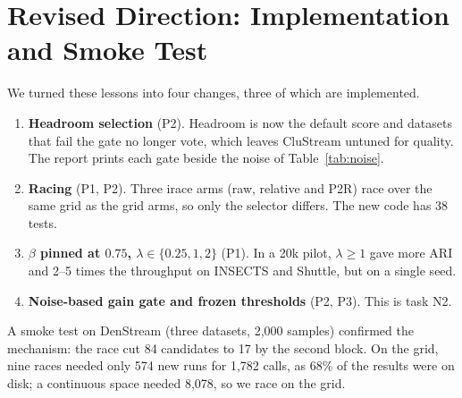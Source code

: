 \section{Revised Direction: Implementation and Smoke Test}
\label{sec:apply}

We turned these lessons into four changes, three of which are implemented.
\begin{enumerate}[label=\textbf{(\alph*)},leftmargin=2em,itemsep=1pt,topsep=2pt]
  \item \textbf{Headroom selection} (P2). Headroom is now the default score and datasets that fail the gate no longer vote, which leaves CluStream untuned for quality. The report prints each gate beside the noise of Table~\ref{tab:noise}.
  \item \textbf{Racing} (P1, P2). Three irace arms (raw, relative and P2R) race over the same grid as the grid arms, so only the selector differs. The new code has 38 tests.
  \item \textbf{$\beta$ pinned at $0.75$, $\lambda \in \{0.25, 1, 2\}$} (P1). In a 20k pilot, $\lambda \ge 1$ gave more ARI and 2--5 times the throughput on INSECTS and Shuttle, but on a single seed.
  \item \textbf{Noise-based gain gate and frozen thresholds} (P2, P3). This is task N2.
\end{enumerate}

\noindent A smoke test on DenStream (three datasets, 2{,}000 samples) confirmed the mechanism: the race cut 84 candidates to 17 by the second block. On the grid, nine races needed only 574 new runs for 1{,}782 calls, as 68\% of the results were on disk; a continuous space needed 8{,}078, so we race on the grid.
